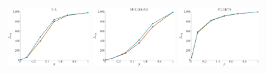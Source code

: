 \documentclass[a4paper]{report}
\newcommand{\wratio}{0.16}
\begin{document}
\includegraphics[width=\wratio\textwidth]{influence/E_R/fs_e_r}\hfill
\includegraphics[width=\wratio\textwidth]{influence/EUROROAD/fs_euroroad}\hfill
\includegraphics[width=\wratio\textwidth]{influence/FLIGHTS/fs_flights}\hfill
\end{document}
